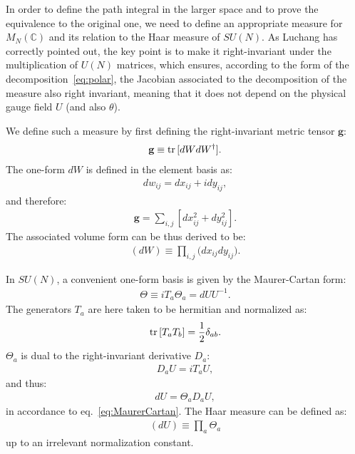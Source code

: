 \documentclass[12pt]{article}
\begin{document}
In order to define the path integral in the larger space
and to prove the equivalence to the original one,
we need to define an appropriate measure for $M_N(\mathbb{C})$
and its relation to the Haar measure of $SU(N)$.
As Luchang has correctly pointed out,
the key point is to make it right-invariant under
the multiplication of $U(N)$ matrices,
which ensures, according to the form of the decomposition~\eqref{eq:polar},
the Jacobian associated to
the decomposition of the measure also right invariant,
meaning that it does not depend on the physical gauge field $U$
(and also $\theta$).

We define such a measure by
first defining the right-invariant metric tensor $\textbf{g}$:
\begin{align}
  \textbf{g}
  \equiv
  {\rm tr}\, [dW dW^\dagger].
\end{align}
The one-form $dW$ is defined in the element basis as:
\begin{align}
  dw_{ij} = dx_{ij} + i dy_{ij},
\end{align}
and therefore:
\begin{align}
  \textbf{g}
  =
  \sum_{i,j}[dx_{ij}^2 + dy_{ij}^2].
\end{align}
The associated volume form can be thus derived to be:
\begin{align}
  (dW)
  \equiv
  \prod_{i,j}
  \big(
  dx_{ij} dy_{ij}
  \big).
  \label{eq:measure_flat}
\end{align}

In $SU(N)$, a convenient one-form basis
is given by the Maurer-Cartan form:
\begin{align}
  \Theta \equiv i T_a \Theta_a = dU U^{-1}. \label{eq:MaurerCartan}
\end{align}
The generators $T_a$ are here taken to be hermitian and normalized as:
\begin{align}
  {\rm tr}\,[T_a T_b] = \frac{1}{2} \delta_{ab}.
\end{align}
$\Theta_a$ is dual to the right-invariant derivative $D_a$:
\begin{align}
  D_a U = i T_a U,
\end{align}
and thus:
\begin{align}
  dU = \Theta_a D_a U,
\end{align}
in accordance to eq.~\eqref{eq:MaurerCartan}.
The Haar measure can be defined as:
\begin{align}
  (dU) \equiv \prod_a \Theta_a
\end{align}
up to an irrelevant normalization constant.
\end{document}
